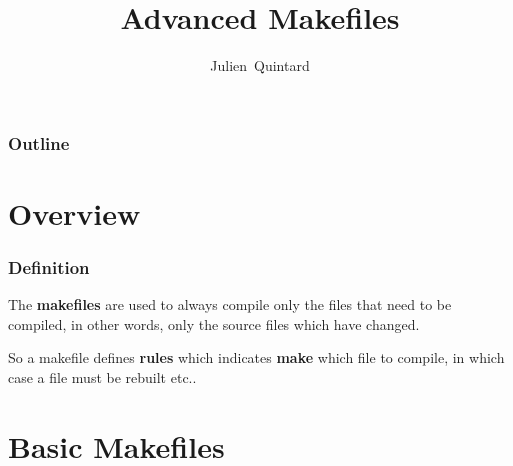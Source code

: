 
%
%



%
%

\title{Advanced Makefiles}

%
%

\author
{
  Julien~Quintard
}

%
%



%
%

\begin{frame}
  \titlepage

  \begin{center}
    \logos
  \end{center}
\end{frame}

%
%

\begin{frame}
  \frametitle{Outline}
  \tableofcontents
\end{frame}

%
%

\section{Overview}


\begin{frame}
  \frametitle{Definition}

  The \textbf{makefiles} are used to always compile only the files
  that need to be compiled, in other words, only the source files which
  have changed.

  \nl

  So a makefile defines \textbf{rules} which indicates \textbf{make}
  which file to compile, in which case a file must be rebuilt etc..
\end{frame}

%
%

\section{Basic Makefiles}

